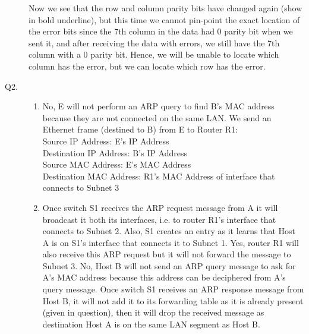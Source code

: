 \documentclass{csc_assignment}
\begin{document}
\begin{description}
Now we see that the row and column parity bits have changed again (show in bold underline), but this time we cannot pin-point the exact location of the error bits since the 7th column in the data had 0 parity bit when we sent it, and after receiving the data with errors, we still have the 7th column with a 0 parity bit. Hence, we will be unable to locate which column has the error, but we can locate which row has the error. 


\item[Q2.]
  \begin{enumerate}
  \item No, E will not perform an ARP query to find B's MAC address because they are not connected on the same LAN. We send an Ethernet frame (destined to B) from E to Router R1: \\
  Source IP Address: E's IP Address \\
  Destination IP Address: B's IP Address \\
  Source MAC Address: E's MAC Address \\
  Destination MAC Address: R1's MAC Address of interface that connects to Subnet 3
  \item Once switch S1 receives the ARP request message from A it will broadcast it both its interfaces, i.e. to router R1's interface that connects to Subnet 2. Also, S1 creates an entry as it learns that Host A is on S1's interface that connects it to Subnet 1. Yes, router R1 will also receive this ARP request but it will not forward the message to Subnet 3. No, Host B will not send an ARP query message to ask for A's MAC address because this address can be deciphered from A's query message. Once switch S1 receives an ARP response message from Host B, it will not add it to its forwarding table as it is already present (given in question), then it will drop the received message as destination Host A is on the same LAN segment as Host B. 
  \end{enumerate} 
  


\end{description}
\end{document}
